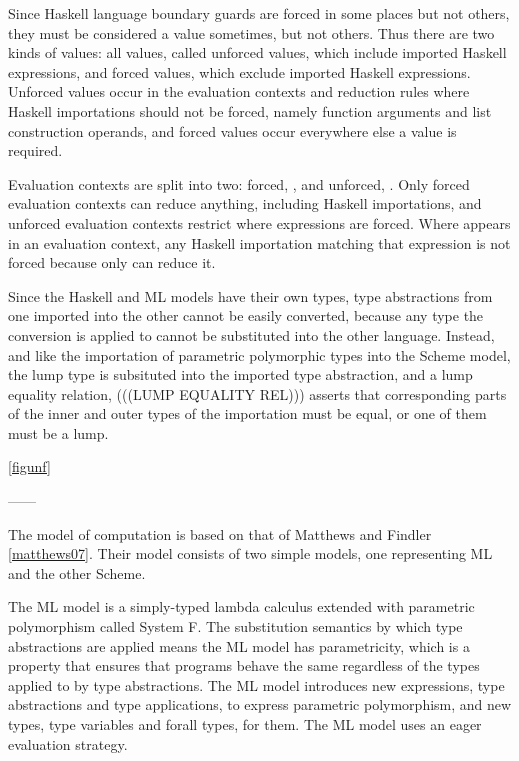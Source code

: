 Since Haskell language boundary guards are forced in some places but not others, they must be considered a value sometimes, but not others. Thus there are two kinds of values: all values, called unforced values, which include imported Haskell expressions, and forced values, which exclude imported Haskell expressions. Unforced values occur in the evaluation contexts and reduction rules where Haskell importations should not be forced, namely function arguments and list construction operands, and forced values occur everywhere else a value is required.

Evaluation contexts are split into two: forced, \varconf, and unforced, \varconu. Only forced evaluation contexts can reduce anything, including Haskell importations, and unforced evaluation contexts restrict where expressions are forced. Where \varconu appears in an evaluation context, any Haskell importation matching that expression is not forced because only \varconf can reduce it.

Since the Haskell and ML models have their own types, type abstractions from one imported into the other cannot be easily converted, because any type the conversion is applied to cannot be substituted into the other language. Instead, and like the importation of parametric polymorphic types into the Scheme model, the lump type is subsituted into the imported type abstraction, and a lump equality relation, (((LUMP EQUALITY REL))) asserts that corresponding parts of the inner and outer types of the importation must be equal, or one of them must be a lump.

\ref{figunf}



------

The model of computation is based on that of Matthews and Findler \ref{matthews07}. Their model consists of two simple models, one representing ML and the other Scheme.

The ML model is a simply-typed lambda calculus extended with parametric polymorphism called System F. The substitution semantics by which type abstractions are applied means the ML model has parametricity, which is a property that ensures that programs behave the same regardless of the types applied to by type abstractions.  The ML model introduces new expressions, type abstractions and type applications, to express parametric polymorphism, and new types, type variables and forall types, for them. The ML model uses an eager evaluation strategy.

